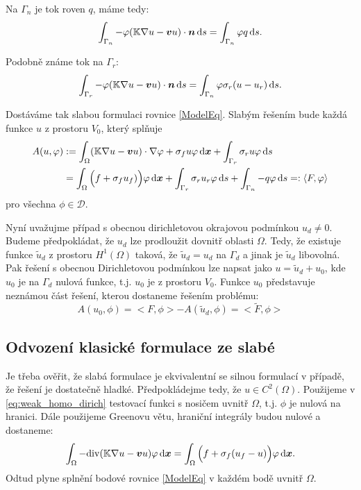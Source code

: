 Na $\Gamma_n$ je tok roven $q$, máme tedy:
\[
    \int_{\Gamma_n} -\varphi({\mathbb{K}}\nabla u-\mathbf{\boldsymbol{v}} u)\cdot \mathbf{\boldsymbol{n}} \,{\rm d} s = \int_{\Gamma_n} \varphi q \,{\rm d} s.
\]

Podobně známe tok na $\Gamma_r$:
\[
    \int_{\Gamma_r} -\varphi({\mathbb{K}}\nabla u-\mathbf{\boldsymbol{v}} u)\cdot \mathbf{\boldsymbol{n}} \,{\rm d} s = \int_{\Gamma_n} \varphi \sigma_r(u - u_r) \,{\rm d} s.
\]

Dostáváme tak slabou formulaci rovnice \eqref{ModelEq}. Slabým řešením bude každá funkce $u$ z prostoru $V_0$, který splňuje
\begin{align}
    \label{eq:weak_homo_dirich}
    A(u,\varphi) &:= \int_\Omega ({\mathbb{K}}\nabla u-\mathbf{\boldsymbol{v}} u) \cdot \nabla \varphi   +   \sigma_f u \varphi \,{\rm d} \mathbf{\boldsymbol{x}} 
              + \int_{\Gamma_r} \sigma_r u \varphi \,{\rm d} s \\
              &=  \int_\Omega \Big(f + \sigma_f u_f)\Big)\varphi \,{\rm d} \mathbf{\boldsymbol{x}} + \int_{\Gamma_r} \sigma_r u_r \varphi \,{\rm d} s + \int_{\Gamma_n} -q \varphi \,{\rm d} s =: \langle F, \varphi \rangle
\end{align}
pro všechna $\phi \in \mathcal D$.

Nyní uvažujme případ s obecnou dirichletovou okrajovou podmínkou $u_d\ne 0$. Budeme předpokládat, že $u_d$ lze prodloužit dovnitř oblasti $\Omega$. Tedy, že existuje 
funkce $\tilde u_d$ z prostoru $H^1(\Omega)$ taková, že $\tilde u_d = u_d$ na $\Gamma_d$ a jinak je $\tilde u_d$ libovolná. Pak řešení s obecnou Dirichletovou podmínkou
lze napsat jako $u = \tilde u_d + u_0$, kde $u_0$ je na $\Gamma_d$ nulová funkce, t.j. $u_0$ je z prostoru $V_0$. Funkce $u_0$ představuje neznámou část řešení, 
kterou dostaneme řešením problému:
\[
    A(u_0, \phi) = <F, \phi> - A(\tilde u_d, \phi) = <\tilde F, \phi>
\]



\subsection{Odvození klasické formulace ze slabé}
Je třeba ověřit, že slabá formulace je ekvivalentní se silnou formulací v případě, že řešení je dostatečně hladké. Předpokládejme tedy, že $u\in C^2(\Omega)$.
Použijeme v \eqref{eq:weak_homo_dirich} testovací funkci s nosičem uvnitř $\Omega$, t.j. $\phi$ je nulová na hranici. Dále použijeme Greenovu větu, 
hraniční integrály budou nulové a dostaneme:
\begin{equation}
    \label{eq:green_interior}
    \int_\Omega -{\rm div} ({\mathbb{K}}\nabla u-\mathbf{\boldsymbol{v}} u) \varphi \,{\rm d} \mathbf{\boldsymbol{x}} = \int_\Omega \Big(f + \sigma_f (u_f - u)\Big)\varphi \,{\rm d} \mathbf{\boldsymbol{x}}.
\end{equation}
Odtud plyne splnění bodové rovnice \eqref{ModelEq} v každém bodě uvnitř $\Omega$.

